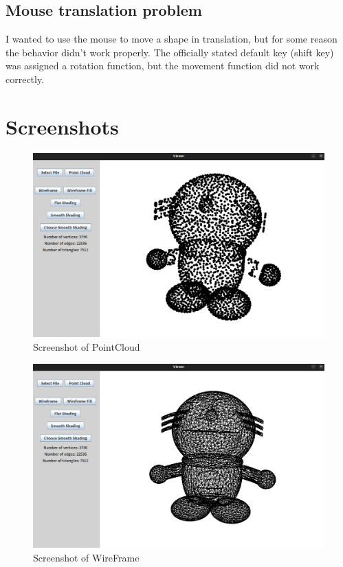 \documentclass[12pt]{article}
\begin{document}
\subsection{Mouse translation problem}
I wanted to use the mouse to move a shape in translation, but for some reason
the
behavior didn't work properly. The officially stated default key (shift key)
was assigned a rotation function, but the movement function did not work
correctly.

\section{Screenshots}
\begin{figure}[h]
    \centering
    \includegraphics[width=1.0\textwidth]{sc1.png}
    \caption{Screenshot of PointCloud}
    \label{fig:my_label}
\end{figure}

\begin{figure}[h]
    \centering
    \includegraphics[width=1.0\textwidth]{sc2.png}
    \caption{Screenshot of WireFrame}
    \label{fig:my_label}
\end{figure}
\end{document}
